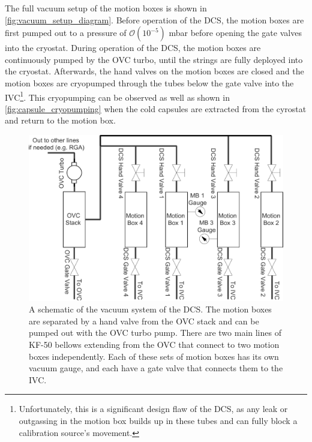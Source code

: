 The full vacuum setup of the motion boxes is shown in \autoref{fig:vacuum_setup_diagram}.
Before operation of the DCS, the motion boxes are first pumped out to a pressure of $\mathcal{O}(10^{-5})$ mbar before opening the gate valves into the cryostat.
During operation of the DCS, the motion boxes are continuously pumped by the OVC turbo, until the strings are fully deployed into the cryostat.
Afterwards, the hand valves on the motion boxes are closed and the motion boxes are cryopumped through the tubes below the gate valve into the IVC\footnote{Unfortunately, this is a significant design flaw of the DCS, as any leak or outgassing in the motion box builds up in these tubes and can fully block a calibration source's movement.}.
This cryopumping can be observed as well as shown in \autoref{fig:capsule_cryopumping} when the cold capsules are extracted from the cyrostat and return to the motion box.

\begin{figure}[htbp]
    \centering
    \includegraphics[width=0.9\linewidth]{Figures/DCS_Vacuum_System_Edit.pdf}
    \caption[A schematic of the vacuum system of the DCS.]
    {A schematic of the vacuum system of the DCS.
    The motion boxes are separated by a hand valve from the OVC stack and can be pumped out with the OVC turbo pump.
    There are two main lines of KF-50 bellows extending from the OVC that connect to two motion boxes independently.
    Each of these sets of motion boxes has its own vacuum gauge, and each have a gate valve that connects them to the IVC.}
    \label{fig:vacuum_setup_diagram}
\end{figure}

